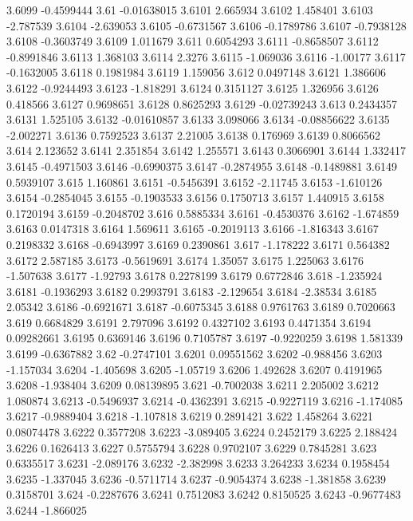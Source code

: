 3.6099  -0.4599444
3.61  -0.01638015
3.6101  2.665934
3.6102  1.458401
3.6103  -2.787539
3.6104  -2.639053
3.6105  -0.6731567
3.6106  -0.1789786
3.6107  -0.7938128
3.6108  -0.3603749
3.6109  1.011679
3.611  0.6054293
3.6111  -0.8658507
3.6112  -0.8991846
3.6113  1.368103
3.6114  2.3276
3.6115  -1.069036
3.6116  -1.00177
3.6117  -0.1632005
3.6118  0.1981984
3.6119  1.159056
3.612  0.0497148
3.6121  1.386606
3.6122  -0.9244493
3.6123  -1.818291
3.6124  0.3151127
3.6125  1.326956
3.6126  0.418566
3.6127  0.9698651
3.6128  0.8625293
3.6129  -0.02739243
3.613  0.2434357
3.6131  1.525105
3.6132  -0.01610857
3.6133  3.098066
3.6134  -0.08856622
3.6135  -2.002271
3.6136  0.7592523
3.6137  2.21005
3.6138  0.176969
3.6139  0.8066562
3.614  2.123652
3.6141  2.351854
3.6142  1.255571
3.6143  0.3066901
3.6144  1.332417
3.6145  -0.4971503
3.6146  -0.6990375
3.6147  -0.2874955
3.6148  -0.1489881
3.6149  0.5939107
3.615  1.160861
3.6151  -0.5456391
3.6152  -2.11745
3.6153  -1.610126
3.6154  -0.2854045
3.6155  -0.1903533
3.6156  0.1750713
3.6157  1.440915
3.6158  0.1720194
3.6159  -0.2048702
3.616  0.5885334
3.6161  -0.4530376
3.6162  -1.674859
3.6163  0.0147318
3.6164  1.569611
3.6165  -0.2019113
3.6166  -1.816343
3.6167  0.2198332
3.6168  -0.6943997
3.6169  0.2390861
3.617  -1.178222
3.6171  0.564382
3.6172  2.587185
3.6173  -0.5619691
3.6174  1.35057
3.6175  1.225063
3.6176  -1.507638
3.6177  -1.92793
3.6178  0.2278199
3.6179  0.6772846
3.618  -1.235924
3.6181  -0.1936293
3.6182  0.2993791
3.6183  -2.129654
3.6184  -2.38534
3.6185  2.05342
3.6186  -0.6921671
3.6187  -0.6075345
3.6188  0.9761763
3.6189  0.7020663
3.619  0.6684829
3.6191  2.797096
3.6192  0.4327102
3.6193  0.4471354
3.6194  0.09282661
3.6195  0.6369146
3.6196  0.7105787
3.6197  -0.9220259
3.6198  1.581339
3.6199  -0.6367882
3.62  -0.2747101
3.6201  0.09551562
3.6202  -0.988456
3.6203  -1.157034
3.6204  -1.405698
3.6205  -1.05719
3.6206  1.492628
3.6207  0.4191965
3.6208  -1.938404
3.6209  0.08139895
3.621  -0.7002038
3.6211  2.205002
3.6212  1.080874
3.6213  -0.5496937
3.6214  -0.4362391
3.6215  -0.9227119
3.6216  -1.174085
3.6217  -0.9889404
3.6218  -1.107818
3.6219  0.2891421
3.622  1.458264
3.6221  0.08074478
3.6222  0.3577208
3.6223  -3.089405
3.6224  0.2452179
3.6225  2.188424
3.6226  0.1626413
3.6227  0.5755794
3.6228  0.9702107
3.6229  0.7845281
3.623  0.6335517
3.6231  -2.089176
3.6232  -2.382998
3.6233  3.264233
3.6234  0.1958454
3.6235  -1.337045
3.6236  -0.5711714
3.6237  -0.9054374
3.6238  -1.381858
3.6239  0.3158701
3.624  -0.2287676
3.6241  0.7512083
3.6242  0.8150525
3.6243  -0.9677483
3.6244  -1.866025
